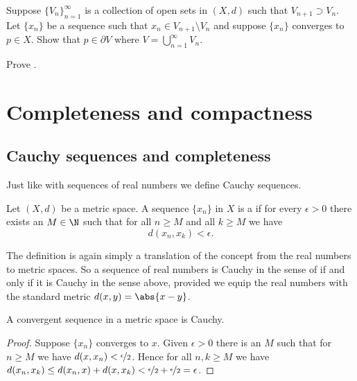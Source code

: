\documentclass[12pt]{book}
\begin{document}
\begin{exercise}
Suppose $\{ V_n \}_{n=1}^\infty$ is a collection of open sets
in $(X,d)$
such that $V_{n+1} \supset V_n$.
Let $\{ x_n \}$ be a sequence
such that $x_n \in V_{n+1} \setminus V_n$ and suppose 
$\{ x_n \}$ converges to $p \in X$.
Show that $p \in \partial V$
where $V = \bigcup_{n=1}^\infty V_n$.
\end{exercise}

\begin{exercise}
Prove .
\end{exercise}


\sectionnewpage
\section{Completeness and compactness}
\label{sec:metcompact}


\subsection*{Cauchy sequences and completeness}

Just like with sequences of real numbers we define Cauchy sequences.

\begin{defn}
Let $(X,d)$ be a metric space.
A sequence $\{ x_n \}$ in $X$ is a \emph{} if
for every $\epsilon > 0$ there exists an $M \in \N$ such that
for all $n \geq M$ and all $k \geq M$ we have
\begin{equation*}
d(x_n, x_k) < \epsilon .
\end{equation*}
\end{defn}

The definition is again simply a translation of the concept
from the real numbers to metric spaces.
So a sequence of real
numbers is Cauchy in the sense of  if and only if
it is Cauchy in the sense above, provided we equip the real numbers with
the standard metric $d(x,y) = \abs{x-y}$.

\begin{prop}
A convergent sequence in a metric space is Cauchy.
\end{prop}

\begin{proof}
Suppose $\{ x_n \}$ converges to $x$.
Given $\epsilon > 0$ there is an $M$ such that for $n \geq M$
we have $d(x,x_n) < \nicefrac{\epsilon}{2}$.
Hence
for all $n,k \geq M$ we have
$d(x_n,x_k) \leq d(x_n,x) + d(x,x_k) < \nicefrac{\epsilon}{2} +
\nicefrac{\epsilon}{2} = \epsilon$.
\end{proof}
\end{document}
